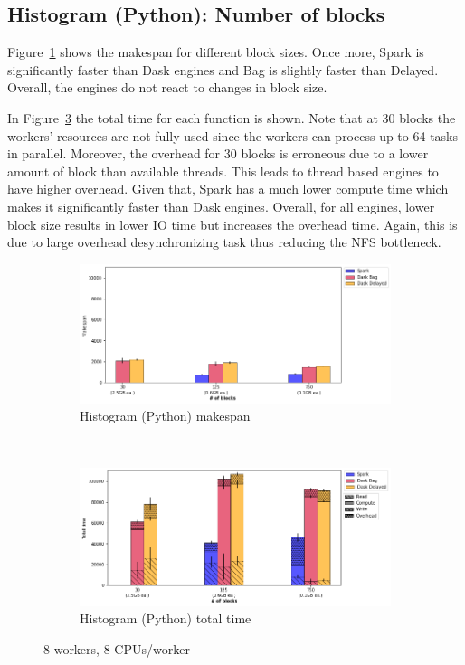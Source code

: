 \documentclass[conference]{IEEEtran}
\newcommand{\TG}[1]{\color{cyan}From Tristan: #1 \color{black}}
\begin{document}
\subsection{Histogram (Python): Number of blocks}
Figure~\ref{fig:histo_ms_block} shows the makespan for different block sizes. 
Once more, Spark is significantly faster than Dask engines and Bag is slightly
faster than Delayed. Overall, the engines do not react to changes in block size.

In Figure~\ref{fig:histo_tt_block} the total time for each function is shown.
Note that at 30 blocks the workers' resources are not fully used since the
workers can process up to 64 tasks in parallel. Moreover, the overhead for
30 blocks is erroneous due to a lower amount of block than available threads.
This leads to thread based engines to have higher overhead. Given that, 
Spark has a much lower compute time which makes it significantly faster
than Dask engines. Overall, for all engines, lower block size results in lower
IO time but increases the overhead time. Again, this is due to large overhead
desynchronizing task thus reducing the NFS bottleneck.


\begin{figure}[!t]
    \centering
    \begin{subfigure}[b]{\columnwidth}
        \includegraphics[clip,width=\columnwidth]{images/histo_block.png}%
        \caption{Histogram (Python) makespan}\label{fig:histo_ms_block}
    \end{subfigure}
    \\
    \begin{subfigure}[b]{\columnwidth}
        \includegraphics[clip,width=\columnwidth]{images/histo_idle_block.png}%
        \caption{Histogram (Python) total time}\label{fig:histo_tt_block}
    \end{subfigure}
    \caption{8 workers, 8 CPUs/worker}
\end{figure}
\end{document}
